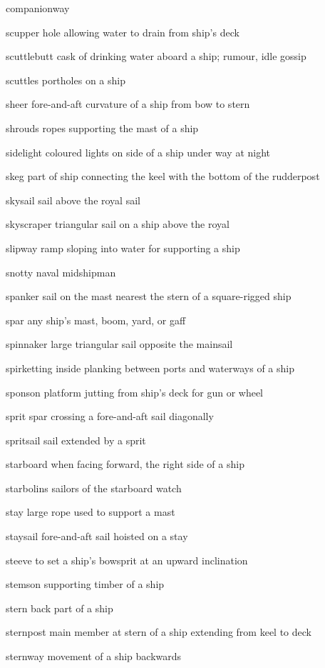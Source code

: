 \documentclass[
  11pt,
  msmallroyalvopaper
]{memoir}
\begin{document}
\begin{labeling}{companionway}
\item[scupper]
hole allowing water to drain from ship's deck
\item[scuttlebutt]
cask of drinking water aboard a ship; rumour, idle gossip
\item[scuttles]
portholes on a ship
\item[sheer]
fore-and-aft curvature of a ship from bow to stern
\item[shrouds]
ropes supporting the mast of a ship
\item[sidelight]
coloured lights on side of a ship under way at night
\item[skeg]
part of ship connecting the keel with the bottom of the rudderpost
\item[skysail]
sail above the royal sail
\item[skyscraper]
triangular sail on a ship above the royal
\item[slipway]
ramp sloping into water for supporting a ship
\item[snotty]
naval midshipman
\item[spanker]
sail on the mast nearest the stern of a square-rigged ship
\item[spar]
any ship's mast, boom, yard, or gaff
\item[spinnaker]
large triangular sail opposite the mainsail
\item[spirketting]
inside planking between ports and waterways of a ship
\item[sponson]
platform jutting from ship's deck for gun or wheel
\item[sprit]
spar crossing a fore-and-aft sail diagonally
\item[spritsail]
sail extended by a sprit
\item[starboard]
when facing forward, the right side of a ship
\item[starbolins]
sailors of the starboard watch
\item[stay]
large rope used to support a mast
\item[staysail]
fore-and-aft sail hoisted on a stay
\item[steeve]
to set a ship's bowsprit at an upward inclination
\item[stemson]
supporting timber of a ship
\item[stern]
back part of a ship
\item[sternpost]
main member at stern of a ship extending from keel to deck
\item[sternway]
movement of a ship backwards

\end{labeling}
\end{document}
